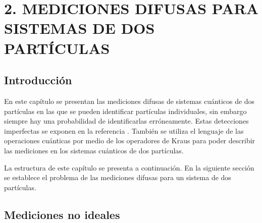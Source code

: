 \chapter[MEDICIONES DIFUSAS PARA SISTEMA DE DOS PARTÍCULAS]{2. MEDICIONES DIFUSAS PARA SISTEMAS DE DOS PARTÍCULAS}

\section{Introducción}
 En este capítulo se presentan las mediciones difusas de sistemas cuánticos de
dos partículas en las que se pueden identificar partículas individuales, sin embargo siempre hay una probabilidad de identificarlas erróneamente. Estas detecciones imperfectas se exponen en la referencia {\cite{Pineda_2021}}. También se utiliza el lenguaje de las operaciones cuánticas por medio de los operadores de Kraus para poder describir las mediciones en los sistemas cuánticos de dos partículas.

La estructura de este capítulo se presenta a continuación. 
En la siguiente sección se establece el problema de las mediciones difusas para un sistema de dos partículas. 


\section{Mediciones no ideales}



